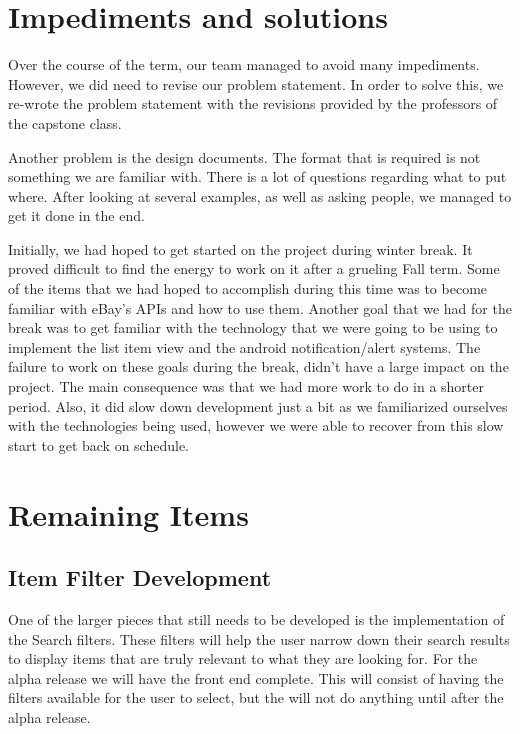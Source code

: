 \documentclass[journal,compsoc, 10pt, draftclsnofoot, onecolumn]{IEEEtran}
\begin{document}
\section{Impediments and solutions}
Over the course of the term, our team managed to avoid many impediments. However, 
we did need to revise our problem statement. In order to solve this, we re-wrote the 
problem statement with the revisions provided by the professors of the capstone 
class. \newline

Another problem is the design documents. The format that is required is not 
something we are familiar with. There is a lot of questions regarding what to 
put where. After looking at several examples, as well as asking people, 
we managed to get it done in the end.\newline

Initially, we had hoped to get started on the project during winter break. 
It proved difficult to find the energy to work on it after a grueling Fall 
term. Some of the items that we had hoped to accomplish during this time was 
to become familiar with eBay's APIs and how to use them. Another goal that we 
had for the break was to get familiar with the technology that we were going 
to be using to implement the list item view and the android notification/alert 
systems. The failure to work on these goals during the break, didn't have a 
large impact on the project. The main consequence was that we had more work to 
do in a shorter period. Also, it did slow down development just a bit as we 
familiarized ourselves with the technologies being used, however we were able 
to recover from this slow start to get back on schedule.

\section{Remaining Items}

\subsection{Item Filter Development}
One of the larger pieces that still needs to be developed is the implementation
 of the Search filters. These filters will help the user narrow down their 
search results to display items that are truly relevant to what they are 
looking for. For the alpha release we will have the front end complete. This 
will consist of having the filters available for the user to select, but the 
will not do anything until after the alpha release. 
\end{document}
